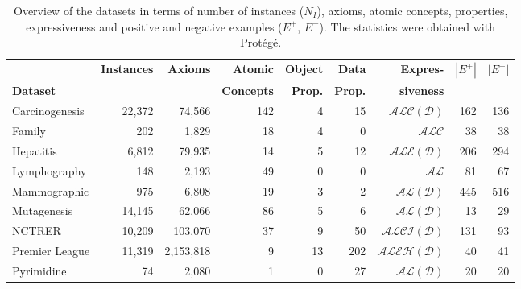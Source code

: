 \begin{table}[tb]
\centering
\caption{Overview of the datasets in terms of number of instances ($N_I$), axioms, atomic concepts, properties, expressiveness and positive and negative examples ($E^+$, $E^-$). The statistics were obtained with Prot\'eg\'e.}%
\label{tab:evaluation-datasets}
\setlength{\tabcolsep}{1pt}
\renewcommand{\arraystretch}{1.1}
\footnotesize
\begin{tabular}{@{}l@{\hskip -7pt}rrrrrrrr@{}}
  \toprule
   & \textbf{Instances} & \textbf{Axioms} & {\textbf{Atomic}} & \textbf{Object} & \textbf{Data} & \textbf{Expres-} & $|E^{+}|$ & $|E^{-}|$  \\
  \textbf{Dataset} & & & {\textbf{Concepts}} & \textbf{Prop.} & \textbf{Prop.} & \textbf{siveness} & &  \\
  \midrule
  Carcinogenesis & 22,372 &    74,566 & 142 &  4 &  15 & $ \mathcal{ALC(D)}$  & 162 & 136 \\
  Family         &    202 &     1,829 &  18 &  4 &   0 & $ \mathcal{ALC}$     &  38 &  38 \\
  Hepatitis      &  6,812 &    79,935 &  14 &  5 &  12 & $ \mathcal{ALE(D)}$  & 206 & 294 \\
  Lymphography   &    148 &     2,193 &  49 &  0 &   0 & $ \mathcal{AL}$      &  81 &  67 \\
  Mammographic   &    975 &     6,808 &  19 &  3 &   2 & $ \mathcal{AL(D)}$   & 445 & 516 \\
  Mutagenesis    & 14,145 &    62,066 &  86 &  5 &   6 & $ \mathcal{AL(D)}$   &  13 &  29 \\
  NCTRER         & 10,209 &   103,070 &  37 &  9 &  50 & $ \mathcal{ALCI(D)}$ & 131 &  93 \\
  Premier League & 11,319 & 2,153,818 &  9 & 13 & 202 & $ \mathcal{ALEH(D)}$ &  40 &  41 \\
  Pyrimidine     &     74 &     2,080 &   1 &  0 &  27 & $ \mathcal{AL(D)}$   &  20 &  20 \\
  \bottomrule
\end{tabular}
\end{table}